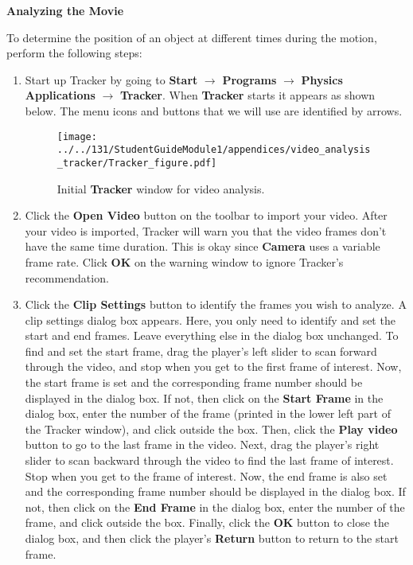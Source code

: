 \textbf{Analyzing the Movie} 

To determine the position of an object at different times during the
motion, perform the following steps:

\begin{enumerate}

\item Start up Tracker by going to {\bf Start} $\rightarrow$ {\bf Programs} $\rightarrow$ {\bf Physics Applications} $\rightarrow$ {\bf Tracker}. 
When {\bf Tracker} starts it appears as shown below. The menu icons and buttons that we will use are identified by arrows.
\begin{figure}[hbt]
\begin{center}
\texttt{[image: ../../131/StudentGuideModule1/appendices/video\_analysis\_tracker/Tracker\_figure.pdf]}
\caption{Initial {\bf Tracker} window for video analysis.}
\end{center}
\end{figure}

\item Click the {\bf Open Video} button on the toolbar to import your video. 
After your video is imported, Tracker will warn you that the video frames 
don't have the same time duration. 
This is okay since \textbf{Camera} uses a variable frame rate. 
Click {\bf OK} on the warning window to ignore Tracker's recommendation.

\item Click the {\bf Clip Settings} button to identify the frames you wish to analyze. 
A clip settings dialog box appears. 
Here, you only need to identify and set the start and end frames. 
Leave everything else in the dialog box unchanged. 
To find and set the start frame, drag the player's left slider to scan forward through the video, and 
stop when you get to the first frame of interest. 
Now, the start frame is set and the corresponding frame number should be displayed in the dialog box. 
If not, then click on the {\bf Start Frame} in the dialog box, enter the number of the frame 
(printed in the lower left part of the Tracker window), and click outside the box.
Then, click the {\bf Play video} button to go to the last frame in the video. 
Next, drag the player's right slider to scan backward through the video to find the last frame of interest. 
Stop when you get to the frame of interest. Now, the end frame is also set and the corresponding frame number should be displayed in the dialog box. 
If not, then click on the {\bf End Frame} in the dialog box, enter the number of the frame, and click outside the box.
Finally, click the {\bf OK} button to close the dialog box, and then click the player's {\bf Return} button to return to the start frame.


\end{enumerate}
